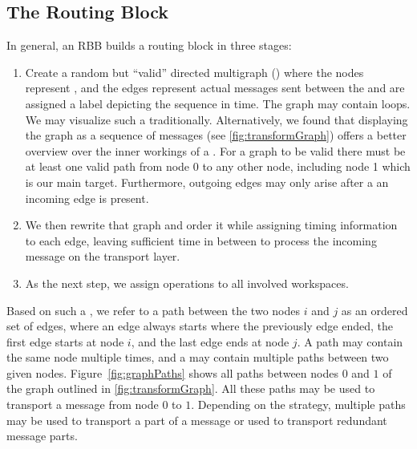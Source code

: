 \subsection{The Routing Block}\label{sec:routingGraph}
In general, an RBB builds a routing block in three stages:
\begin{enumerate}
	\item Create a random but ``valid'' directed multigraph () where the nodes represent \VortexNodes, and the edges represent actual messages sent between the \VortexNodes{} and are assigned a label depicting the sequence in time. The graph may contain loops. We may visualize such a  traditionally. Alternatively, we found that displaying the graph as a sequence of messages (see \cref{fig:transformGraph}) offers a better overview over the inner workings of a . For a graph to be valid there must be at least one valid path from node 0 to any other node, including node 1 which is our main target. Furthermore, outgoing edges may only arise after a an incoming edge is present.
	\item We then rewrite that graph and order it while assigning timing information to each edge, leaving sufficient time in between to process the incoming message on the transport layer.
	\item As the next step, we assign operations to all involved workspaces.
\end{enumerate}

Based on such a , we refer to a path between the two nodes $i$ and $j$ as an ordered set of edges, where an edge always starts where the previously edge ended, the first edge starts at node $i$, and the last edge ends at node $j$. A path may contain the same node multiple times, and a  may contain multiple paths between two given nodes. Figure~\ref{fig:graphPaths} shows all paths between nodes $0$ and $1$ of the graph outlined in \cref{fig:transformGraph}. All these paths may be used to transport a message from node $0$ to $1$. Depending on the strategy, multiple paths may be used to transport a part of a message or used to transport redundant message parts.

\begin{figure*}[ht]
	\centering
	\resizebox{.95\linewidth}{!}{
		
	}
	\caption{Transformation of a graph into a sequence of messages.}
	\label{fig:transformGraph}
\end{figure*}

